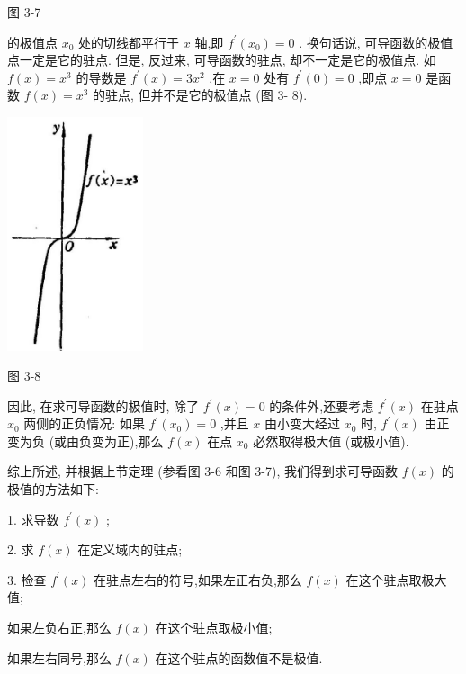 \documentclass[lang=cn,newtx,10pt,scheme=chinese]{elegantbook}
\begin{document}
图 3-7

的极值点 \({x}_{0}\) 处的切线都平行于 \(x\) 轴,即 \({f}^{\prime }\left( {x}_{0}\right) = 0\) . 换句话说, 可导函数的极值点一定是它的驻点. 但是, 反过来, 可导函数的驻点, 却不一定是它的极值点. 如 \(f\left( x\right) = {x}^{3}\) 的导数是 \({f}^{\prime }\left( x\right) = 3{x}^{2}\) ,在 \(x = 0\) 处有 \({f}^{\prime }\left( 0\right) = 0\) ,即点 \(x = 0\) 是函数 \(f\left( x\right) = {x}^{3}\) 的驻点, 但并不是它的极值点 (图 3- 8).

\begin{center}
\includegraphics[max width=0.3\textwidth]{images/01912c18-5c3f-733d-b775-749ba9897a9d_141_203287.jpg}
\end{center}

图 3-8

因此, 在求可导函数的极值时, 除了 \({f}^{\prime }\left( x\right) = 0\) 的条件外,还要考虑 \({f}^{\prime }\left( x\right)\) 在驻点 \({x}_{0}\) 两侧的正负情况: 如果 \({f}^{\prime }\left( {x}_{0}\right) = 0\) ,并且 \(x\) 由小变大经过 \({x}_{0}\) 时, \({f}^{\prime }\left( x\right)\) 由正变为负 (或由负变为正),那么 \(f\left( x\right)\) 在点 \({x}_{0}\) 必然取得极大值 (或极小值).

\begin{proposition}[求解极值的方法]

综上所述, 并根据上节定理 (参看图 3-6 和图 3-7), 我们得到求可导函数 \(f\left( x\right)\) 的极值的方法如下:

1. 求导数 \({f}^{\prime }\left( x\right)\) ;

2. 求 \(f\left( x\right)\) 在定义域内的驻点;

3. 检查 \({f}^{\prime }\left( x\right)\) 在驻点左右的符号,如果左正右负,那么 \(f\left( x\right)\) 在这个驻点取极大值;

如果左负右正,那么 \(f\left( x\right)\) 在这个驻点取极小值;

如果左右同号,那么 \(f\left( x\right)\) 在这个驻点的函数值不是极值.

\end{proposition}
\end{document}
